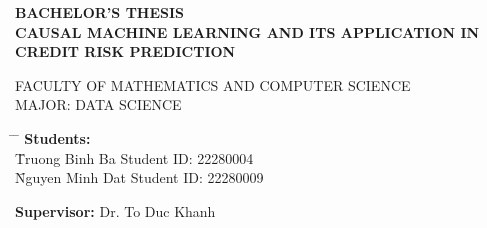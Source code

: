 \documentclass[12pt]{article}
\numberwithin{equation}{section}
\numberwithin{table}{section}
\numberwithin{figure}{section}
\begin{document}
\begin{titlepage}
\vspace{0.5cm}

\begin{center}

    \fontsize{14pt}{14pt}\selectfont 
    \textbf{BACHELOR'S THESIS} \\
    \vspace{10pt}
    \fontsize{17pt}{17pt}\selectfont
    \textbf{CAUSAL MACHINE LEARNING AND ITS APPLICATION IN CREDIT RISK PREDICTION}
    
    \vspace{10pt}
    \fontsize{13pt}{13pt}\selectfont 
    FACULTY OF MATHEMATICS AND COMPUTER SCIENCE \\
    \fontsize{13pt}{13pt}\selectfont 
    MAJOR: DATA SCIENCE \\
\end{center}
\vspace{10pt}
\fontsize{13pt}{13pt}\selectfont

\begin{tabbing}
\hspace{4cm} \= \hspace{5cm} \= \kill
\hspace{3.5cm}\= \textbf{Students:}\\[0.3cm]
\hspace{4cm}\= Truong Binh Ba  \> Student ID: 22280004 \\[0.2cm]
\hspace{4cm}\= Nguyen Minh Dat \> Student ID: 22280009 \\

\end{tabbing}

\begin{center} 
\hspace{0cm} \textbf{Supervisor:} Dr. To Duc Khanh
\end{center}

\begin{center}
\end{center}

\end{titlepage}


\clearpage
\thispagestyle{empty}
\mbox{}
\clearpage

\end{document}
